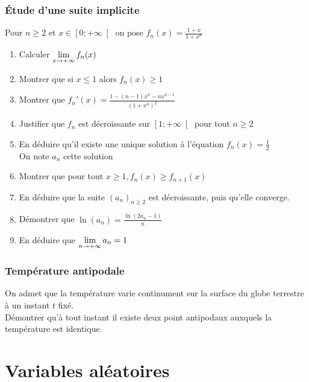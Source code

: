 \documentclass[oneside,12pt]{book}          %
\begin{document}
\subsection{Étude d'une suite implicite}
Pour $n\geq2$ et $x\in\left[0;+\infty\right[$ on pose $f_n(x)=\frac{1+x}{1+x^n}$
\begin{enumerate}
    \item Calculer ${\lim\limits_{x\to +\infty}}\, f_n(x)$
    \item Montrer que si $x\leq1$ alors $f_n(x)\geq1$
    \item Montrer que $f_n'(x)=\frac{1-(n-1)x^n-nx^{n-1}}{\left(1+x^n\right)^2}$
    \item Justifier que $f_n$ est décroissante sur $\left[1;+\infty\right[$ pour tout $n\geq2$
    \item En déduire qu'il existe une unique solution à l'équation $f_n(x)=\frac{1}{2}$\\
    On note $a_n$ cette solution
    \item Montrer que pour tout $x\geq1 , f_n(x)\geq f_{n+1}(x)$
    \item En déduire que la suite $(a_n)_{n\geq2}$ est décroissante, puis qu'elle converge.
    \item Démontrer que $\ln(a_n)=\frac{\ln(2a_n-1)}{n}$
    \item En déduire que ${\lim\limits_{n\to +\infty}}\, a_n=1$
\end{enumerate}



\subsection{Température antipodale}
On admet que la température varie continument sur la surface du globe terrestre à un instant $t$ fixé.\\
Démontrer  qu'à tout instant il existe deux point antipodaux auxquels la température est identique.



\chapter{Variables aléatoires}
\newpage
\end{document}
